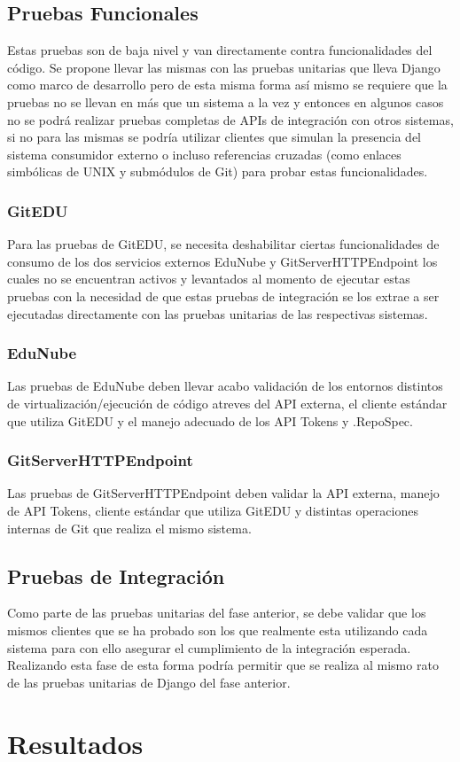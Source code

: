 \subsection{Pruebas Funcionales}
Estas pruebas son de baja nivel y van directamente contra funcionalidades del código. Se propone llevar las mismas con las pruebas unitarias que lleva Django como marco de desarrollo pero de esta misma forma así mismo se requiere que la pruebas no se llevan en más que un sistema a la vez y entonces en algunos casos no se podrá realizar pruebas completas de APIs de integración con otros sistemas, si no para las mismas se podría utilizar clientes que simulan la presencia del sistema consumidor externo o incluso referencias cruzadas (como enlaces simbólicas de UNIX y submódulos de Git) para probar estas funcionalidades.

\subsubsection{GitEDU}
Para las pruebas de GitEDU, se necesita deshabilitar ciertas funcionalidades de consumo de los dos servicios externos EduNube y GitServerHTTPEndpoint los cuales no se encuentran activos y levantados al momento de ejecutar estas pruebas con la necesidad de que estas pruebas de integración se los extrae a ser ejecutadas directamente con las pruebas unitarias de las respectivas sistemas.

\subsubsection{EduNube}
Las pruebas de EduNube deben llevar acabo validación de los entornos distintos de virtualización/ejecución de código atreves del API externa, el cliente estándar que utiliza GitEDU y el manejo adecuado de los API Tokens y .RepoSpec.

\subsubsection{GitServerHTTPEndpoint}
Las pruebas de GitServerHTTPEndpoint deben validar la API externa, manejo de API Tokens, cliente estándar que utiliza GitEDU y distintas operaciones internas de Git que realiza el mismo sistema.

\subsection{Pruebas de Integración}
Como parte de las pruebas unitarias del fase anterior, se debe validar que los mismos clientes que se ha probado son los que realmente esta utilizando cada sistema para con ello asegurar el cumplimiento de la integración esperada. Realizando esta fase de esta forma podría permitir que se realiza al mismo rato de las pruebas unitarias de Django del fase anterior.

\section{Resultados}

